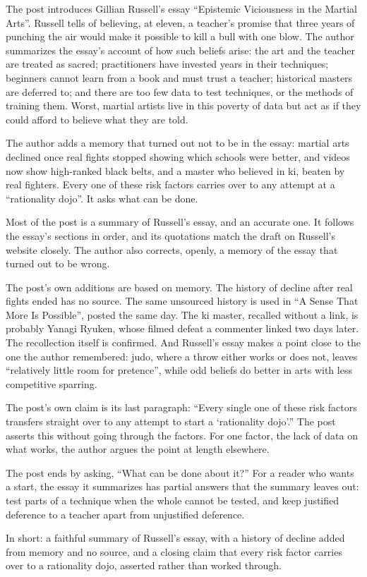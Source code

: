 \begin{afterword}
\summaryhead

The post introduces Gillian Russell's essay ``Epistemic Viciousness in the Martial Arts''. Russell tells of believing, at eleven, a teacher's promise that three years of punching the air would make it possible to kill a bull with one blow. The author summarizes the essay's account of how such beliefs arise: the art and the teacher are treated as sacred; practitioners have invested years in their techniques; beginners cannot learn from a book and must trust a teacher; historical masters are deferred to; and there are too few data to test techniques, or the methods of training them. Worst, martial artists live in this poverty of data but act as if they could afford to believe what they are told.

The author adds a memory that turned out not to be in the essay: martial arts declined once real fights stopped showing which schools were better, and videos now show high-ranked black belts, and a master who believed in ki, beaten by real fighters. Every one of these risk factors carries over to any attempt at a ``rationality dojo''. It asks what can be done.

\responsehead

Most of the post is a summary of Russell's essay, and an accurate one. It follows the essay's sections in order, and its quotations match the draft on Russell's website closely. The author also corrects, openly, a memory of the essay that turned out to be wrong.

The post's own additions are based on memory. The history of decline after real fights ended has no source. The same unsourced history is used in ``A Sense That More Is Possible'', posted the same day. The ki master, recalled without a link, is probably Yanagi Ryuken, whose filmed defeat a commenter linked two days later. The recollection itself is confirmed. And Russell's essay makes a point close to the one the author remembered: judo, where a throw either works or does not, leaves ``relatively little room for pretence'', while odd beliefs do better in arts with less competitive sparring.

The post's own claim is its last paragraph: ``Every single one of these risk factors transfers straight over to any attempt to start a `rationality dojo'.'' The post asserts this without going through the factors. For one factor, the lack of data on what works, the author argues the point at length elsewhere.

The post ends by asking, ``What can be done about it?'' For a reader who wants a start, the essay it summarizes has partial answers that the summary leaves out: test parts of a technique when the whole cannot be tested, and keep justified deference to a teacher apart from unjustified deference.

In short: a faithful summary of Russell's essay, with a history of decline added from memory and no source, and a closing claim that every risk factor carries over to a rationality dojo, asserted rather than worked through.
\end{afterword}
